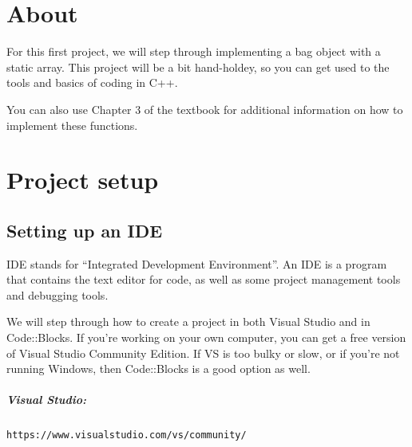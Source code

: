 
\newcommand{\laClass}       {CS 250}
\newcommand{\laSemester}    {Spring 2018}
\newcommand{\laChapter}     {}
\newcommand{\laType}        {Project}
\newcommand{\laAssignment}  {1}
\newcommand{\laPoints}      {5}
\newcommand{\laTitle}       {Bag ADT}
\newcommand{\laStarterFiles}{Download from GitHub.}
\newcommand{\laTopics}      {Data structures, array implementations}
\setcounter{chapter}{0}
\setcounter{section}{1}
\addtocounter{section}{-1}
\toggletrue{answerkey}
\togglefalse{answerkey}




    \chapter{About}

        For this first project, we will step through implementing
        a bag object with a static array. This project will be a bit
        hand-holdey, so you can get used to the tools and basics of
        coding in C++.

        You can also use Chapter 3 of the textbook for additional information
        on how to implement these functions.

        \chapter{Project setup}

        \section{Setting up an IDE}

            IDE stands for ``Integrated Development Environment''. An IDE
            is a program that contains the text editor for code, as well
            as some project management tools and debugging tools.

            We will step through how to create a project in both Visual Studio
            and in Code::Blocks. If you're working on your own computer,
            you can get a free version of Visual Studio Community Edition. If
            VS is too bulky or slow, or if you're not running Windows, then
            Code::Blocks is a good option as well.

            \paragraph{Visual Studio:}
                \texttt{https://www.visualstudio.com/vs/community/}

